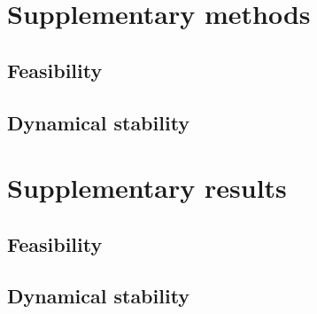 \documentclass[12pt, titlepage, twoside, openright]{report}
\begin{document}
% 
\section{Supplementary methods}
\subsection{Feasibility}

\subsection{Dynamical stability}

%
\FloatBarrier
% 
\section{Supplementary results}
\subsection{Feasibility}

\subsection{Dynamical stability}

%

\FloatBarrier


\end{document}
